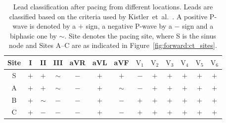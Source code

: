 \begin{table}
\caption[Lead classification under pacing from different locations]{
\label{tbl:forward:inverse:ecgs}
Lead classification after pacing from different locations.
Leads are classified based on the criteria used by
Kistler~et~al.~\cite{Kistler2006}.
A positive P-wave is denoted by a $+$ sign, a negative P-wave by a $-$ sign and
a biphasic one by $\sim$.
Site denotes the pacing site, where S is the sinus node and Sites A--C are as
indicated in Figure~\ref{fig:forward:ct_sites}.
}
\begin{center}
\begin{tabular}{c c c c c c c c c c c c c}
\toprule
Site & I & II & III & aVR & aVL & aVF & $\text{V}_{\text{1}}$ &$\text{V}_{\text{2}}$ & $\text{V}_{\text{3}}$ & $\text{V}_{\text{4}}$ & $\text{V}_{\text{5}}$ & $\text{V}_{\text{6}}$\\
\midrule
S   & $+$ & $+$ & $\sim$ & $-$ & $+$ & $+$ & $-$ & $+$ & $+$ & $+$ & $+$ & $+$ \\
A   & $+$ & $+$ & $\sim$ & $-$ & $+$ & $\sim$ & $-$ & $+$ & $+$ & $+$ & $+$ & $+$ \\
B   & $+$ & $\sim$ & $-$ & $-$ & $+$ & $-$ & $+$ & $+$ & $+$ & $+$ & $+$ & $+$ \\
C   & $+$ & $-$ & $-$ & $-$ & $+$ & $-$ & $+$ & $+$ & $+$ & $+$ & $+$ & $+$ \\
\bottomrule
\end{tabular}
\end{center}
\end{table}

